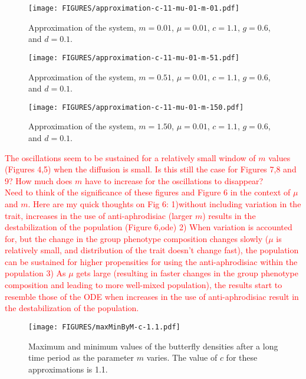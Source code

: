 \documentclass[review,authoryear]{elsarticle}
\begin{document}
\begin{figure}[htb]
  \centering
  \texttt{[image: FIGURES/approximation-c-11-mu-01-m-01.pdf]}
  \caption[Approximation with $c=1.1$, $m=0.01$ and $\mu=0.01$.]{Approximation of
    the system, $m=0.01$, $\mu=0.01$, $c=1.1$, $g=0.6$, and $d=0.1$. }
  \label{fig:approximationM01Mu01C11}
\end{figure}

\begin{figure}[htb]
  \centering
  \texttt{[image: FIGURES/approximation-c-11-mu-01-m-51.pdf]}
  \caption[Approximation with $c=1.1$, $m=0.51$ and $\mu=0.01$.]{Approximation of
    the system, $m=0.51$, $\mu=0.01$, $c=1.1$, $g=0.6$, and $d=0.1$. }
  \label{fig:approximationM51Mu01C11}
\end{figure}


\begin{figure}[htb]
  \centering
  \texttt{[image: FIGURES/approximation-c-11-mu-01-m-150.pdf]}
  \caption[Approximation with $c=1.1$, $m=1.50$ and $\mu=0.01$.]{Approximation of
    the system, $m=1.50$, $\mu=0.01$, $c=1.1$, $g=0.6$, and $d=0.1$. }
  \label{fig:approximationM150Mu01C11}
\end{figure}
\textcolor{red}{The oscillations seem to be sustained for a relatively small window of $m$ values (Figures 4,5) when the diffusion is small. Is this still the case for Figures 7,8 and 9? How much does $m$ have to increase for the oscillations to disappear? 
\\Need to think of the significance of these figures and Figure 6 in the context of $\mu$ and $m$. Here are my quick thoughts on Fig 6: 1)without including variation in the trait, increases in the use of anti-aphrodisiac (larger $m$) results in the destabilization of the population (Figure 6,ode) 2) When variation is accounted for, but the change in the group phenotype composition changes slowly ($\mu$ is relatively small, and distribution of the trait doesn't change fast), the population can be sustained for higher propensities for using the anti-aphrodisiac within the population 3) As $\mu$ gets large (resulting in faster changes in the group phenotype composition and leading to more well-mixed population), the results start to resemble those of the ODE when increases in the use of anti-aphrodisiac result in the destabilization of the population.  }

\begin{figure}[htb]
  \centering
  \texttt{[image: FIGURES/maxMinByM-c-1.1.pdf]}
  \caption[Maximum and minimum values of the butterfly
  density with $c=1.1$]{Maximum and minimum values of the butterfly densities after
    a long time period as the parameter $m$ varies. The value of $c$ for these approximations is 1.1.}
  \label{fig:maxMinButterflySmallMu-c-1.1}
\end{figure}
\end{document}
